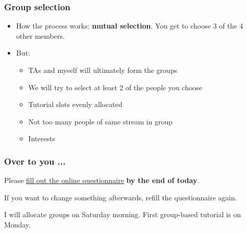\begin{frame}\frametitle{Group selection}
	\begin{itemize}
		\item	How the process works: \textbf{mutual selection}. You get to choose 3 of the 4 other members.
		\item	But:
		\begin{itemize}
			\item	TAs and myself will ultimately form the groups
			\item	We will try to select at least 2 of the people you choose
			\item	Tutorial slots evenly allocated
			\item	Not too many people of same stream in group
			\item	Interests
		\end{itemize}
	\end{itemize}
\end{frame}

\begin{frame}\frametitle{Over to you ...}
	Please \href{https://docs.google.com/spreadsheet/viewform?formkey=dERqREtHZUxVMkRuT2s4bnlzeTdXY2c6MA}{fill out the online questionnaire} \textbf{by the end of today}.
	
	

	\vspace{12pt}
	If you want to change something afterwards, refill the questionnaire again.

	\vspace{12pt}
	I will allocate groups on Saturday morning. First group-based tutorial is on Monday.
	
\end{frame}
